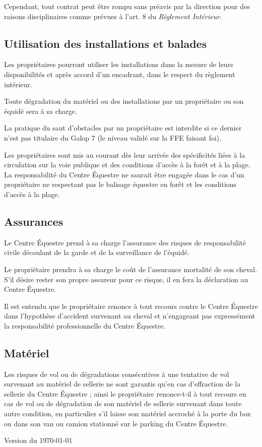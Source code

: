 \documentclass[11pt,a4paper]{article}
\begin{document}
Cependant, tout contrat peut être rompu sans préavis par la direction pour des raisons disciplinaires comme prévues à l'art. 8 du \textit{Règlement Intérieur}.

\subsection*{Utilisation des installations et balades}
Les propriétaires pourront utiliser les installations dans la mesure de leurs disponibilités et après accord d'un encadrant, dans le respect du règlement intérieur.

Toute dégradation du matériel ou des installations par un propriétaire ou son équidé sera à sa charge.

La pratique du saut d'obstacles par un propriétaire est interdite si ce dernier n'est pas titulaire du Galop 7 (le niveau validé sur la FFE faisant foi).

Les propriétaires sont mis au courant dès leur arrivée des spécificités liées à la circulation sur la voie publique et des conditions d'accès à la forêt et à la plage. La responsabilité du Centre Équestre ne saurait être engagée dans le cas d'un propriétaire ne respectant pas le balisage équestre en forêt et les conditions d'accès à la plage.

\subsection*{Assurances}
Le Centre Équestre prend à sa charge l'assurance des risques de responsabilité civile découlant de la garde et de la surveillance de l'équidé.

Le propriétaire prendra à sa charge le coût de l'assurance mortalité de son cheval. S'il désire rester son propre assureur pour ce risque, il en fera la déclaration au Centre Équestre.

Il est entendu que le propriétaire renonce à tout recours contre le Centre Équestre dans l'hypothèse d'accident survenant au cheval et n'engageant pas expressément la responsabilité professionnelle du Centre Équestre.

\subsection*{Matériel}
Les risques de vol ou de dégradations consécutives à une tentative de vol survenant au matériel de sellerie ne sont garantis qu'en cas d'effraction de la sellerie du Centre Équestre ; ainsi le propriétaire renonce-t-il à tout recours en cas de vol ou de dégradation de son matériel de sellerie survenant dans toute autre condition, en particulier s'il laisse son matériel accroché à la porte du box ou dans son van ou camion stationné sur le parking du Centre Équestre.

\vfill
\begin{flushright}
	Version du \today
\end{flushright}
\end{document}
